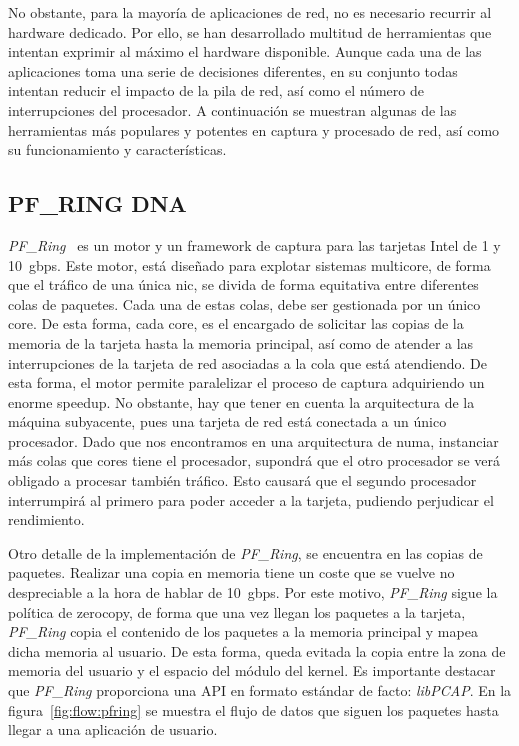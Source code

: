  No obstante, para la mayoría de aplicaciones de red, no es necesario recurrir al hardware dedicado. Por ello, se han desarrollado multitud de herramientas que intentan exprimir al máximo el hardware disponible. Aunque cada una de las aplicaciones toma una serie de decisiones diferentes, en su conjunto todas intentan reducir el impacto de la pila de red, así como el número de interrupciones del procesador. A continuación se muestran algunas de las herramientas más populares y potentes en captura y procesado de red, así como su funcionamiento y características.
 
\subsection{PF\_RING DNA}
\textit{PF\_Ring}~\cite{RizzoDMA,libzeroNTOP} es un motor y un framework de captura para las tarjetas Intel de 1 y 10~\gls{gbps}. Este motor, está diseñado para explotar sistemas \gls{multicore}, de forma que el tráfico de una única \gls{nic}, se divida de forma equitativa entre diferentes colas de paquetes. Cada una de estas colas, debe ser gestionada por un único \gls{core}. De esta forma, cada \gls{core}, es el encargado de solicitar las copias de la memoria de la tarjeta hasta la memoria principal, así como de atender a las interrupciones de la tarjeta de red asociadas a la cola que está atendiendo.
De esta forma, el motor permite paralelizar el proceso de captura adquiriendo un enorme speedup. No obstante, hay que tener en cuenta la arquitectura de la máquina subyacente, pues una tarjeta de red está conectada a un único procesador. Dado que nos encontramos en una arquitectura de \gls{numa}, instanciar más colas que \glspl{core} tiene el procesador, supondrá que el otro procesador se verá obligado a procesar también tráfico. Esto causará que el segundo procesador interrumpirá al primero para poder acceder a la tarjeta, pudiendo perjudicar el rendimiento.

Otro detalle de la implementación de \textit{PF\_Ring}, se encuentra en las copias de paquetes. Realizar una copia en memoria tiene un coste que se vuelve no despreciable a la hora de hablar de 10~\gls{gbps}. Por este motivo, \textit{PF\_Ring} sigue la política de \gls{zerocopy}, de forma que una vez llegan los paquetes a la tarjeta, \textit{PF\_Ring} copia el contenido de los paquetes a la memoria principal y mapea dicha memoria al usuario. De esta forma, queda evitada la copia entre la zona de memoria del usuario y el espacio del módulo del kernel.
Es importante destacar que \textit{PF\_Ring} proporciona una API en formato estándar de facto: \textit{libPCAP}.
En la figura~\ref{fig:flow:pfring} se muestra el flujo de datos que siguen los paquetes hasta llegar a una aplicación de usuario.


